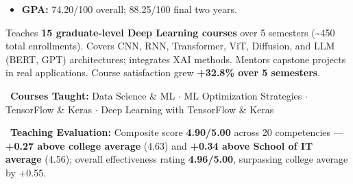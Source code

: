 \documentclass[10pt,a4paper,ragged2e]{altacv}
\begin{document}
\vspace{-7pt}
\divider

\vspace{-1mm}
\begin{itemize}
\item \textbf{GPA:} 74.20/100 overall; 88.25/100 final two years.
\end{itemize}

\vspace{3.5pt}

\vspace{-2pt}

{\small Teaches \textbf{15 graduate-level Deep Learning courses} over 5 semesters (\textasciitilde450 total enrollments). Covers CNN, RNN, Transformer, ViT, Diffusion, and LLM (BERT, GPT) architectures; integrates XAI methods. Mentors capstone projects in real applications. Course satisfaction grew \textbf{+32.8\% over 5 semesters}.}

\vspace{1mm}
\begin{itemize}
\item[] \hspace*{-1.35\leftmargin} \textcolor{VividPurple}{\faBook\ \textbf{Courses Taught:}} Data Science \& ML $\cdot$ ML Optimization Strategies $\cdot$ TensorFlow \& Keras $\cdot$ Deep Learning with TensorFlow \& Keras
{\fontsize{8.5}{10}\selectfont\item[] \hspace*{-1.35\leftmargin} \textcolor{VividPurple}{\faStar\ \textbf{Teaching Evaluation:}} Composite score \textbf{4.90/5.00} across 20 competencies --- \textbf{+0.27 above college average} (4.63) and \textbf{+0.34 above School of IT average} (4.56); overall effectiveness rating \textbf{4.96/5.00}, surpassing college average by +0.55.}
\end{itemize}

\clearpage
\end{document}
